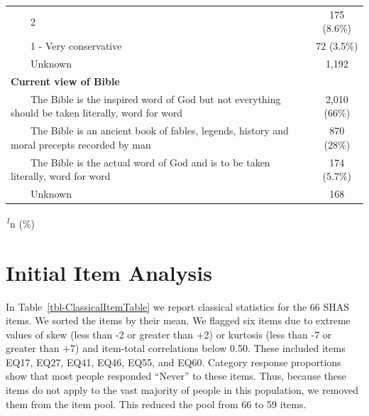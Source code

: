 \documentclass[
  letterpaper,
]{article}
\begin{document}
\begin{longtable}{lc}
    2 & 175 (8.6\%) \\ 
    1 - Very conservative & 72 (3.5\%) \\ 
    Unknown & 1,192 \\ 
{\bfseries Current view of Bible} &  \\ 
    The Bible is the inspired word of God but not everything should be taken literally, word for word & 2,010 (66\%) \\ 
    The Bible is an ancient book of fables, legends, history and moral precepts recorded by man & 870 (28\%) \\ 
    The Bible is the actual word of God and is to be taken literally, word for word & 174 (5.7\%) \\ 
    Unknown & 168 \\ 
\bottomrule

\end{longtable}

\begin{minipage}{\linewidth}
\textsuperscript{\textit{1}}n (\%)\\
\end{minipage}
\endgroup

\section*{Initial Item Analysis}\label{initial-item-analysis}


In Table~\ref{tbl-ClassicalItemTable} we report classical statistics for
the 66 SHAS items. We sorted the items by their mean. We flagged six
items due to extreme values of skew (less than -2 or greater than +2) or
kurtosis (less than -7 or greater than +7) and item-total correlations
below 0.50. These included items EQ17, EQ27, EQ41, EQ46, EQ55, and EQ60.
Category response proportions show that most people responded ``Never''
to these items. Thus, because these items do not apply to the vast
majority of people in this population, we removed them from the item
pool. This reduced the pool from 66 to 59 items.
\end{document}
